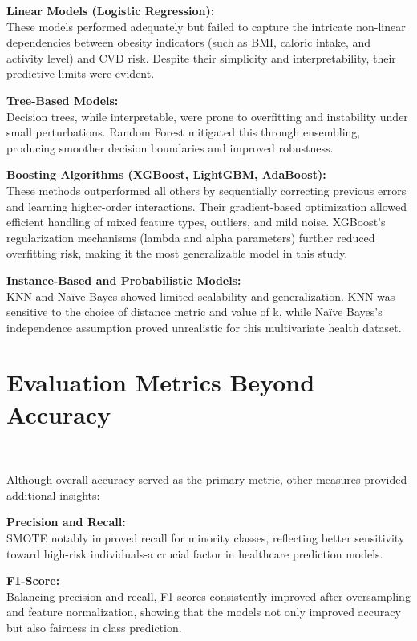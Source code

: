 \textbf{Linear Models (Logistic Regression):}\\
These models performed adequately but failed to capture the intricate non-linear dependencies between obesity indicators (such as BMI, caloric intake, and activity level) and CVD risk.
Despite their simplicity and interpretability, their predictive limits were evident.

\textbf{Tree-Based Models:}\\
Decision trees, while interpretable, were prone to overfitting and instability under small perturbations.
Random Forest mitigated this through ensembling, producing smoother decision boundaries and improved robustness.

\textbf{Boosting Algorithms (XGBoost, LightGBM, AdaBoost):}\\
These methods outperformed all others by sequentially correcting previous errors and learning higher-order interactions.
Their gradient-based optimization allowed efficient handling of mixed feature types, outliers, and mild noise.
XGBoost’s regularization mechanisms (lambda and alpha parameters) further reduced overfitting risk, making it the most generalizable model in this study.

\textbf{Instance-Based and Probabilistic Models:}\\
KNN and Naïve Bayes showed limited scalability and generalization.
KNN was sensitive to the choice of distance metric and value of k, while Naïve Bayes’s independence assumption proved unrealistic for this multivariate health dataset.


\section{Evaluation Metrics Beyond Accuracy}\label{sec:evaluation-metrics-beyond-accuracy}\

Although overall accuracy served as the primary metric, other measures provided additional insights:

\textbf{Precision and Recall:}\\
SMOTE notably improved recall for minority classes, reflecting better sensitivity toward high-risk individuals-a crucial factor in healthcare prediction models.

\textbf{F1-Score:}\\
Balancing precision and recall, F1-scores consistently improved after oversampling and feature normalization, showing that the models not only improved accuracy but also fairness in class prediction.

